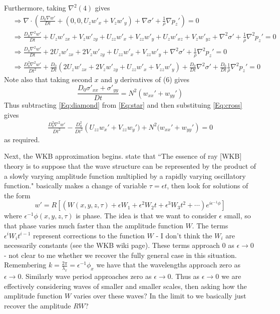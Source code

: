 \documentclass[12pt]{article}
\begin{document}
Furthermore, taking $\nabla^2 (4)$ gives
\begin{align}
&\Rightarrow \nabla \cdot \left(\frac{D_0 \nabla w'}{D t} + (0,0,U_z w'_x + V_z w'_y) + \nabla \sigma' +\frac{1}{\overline{\rho}} \nabla p_z' \right) = 0 \\
&\Rightarrow \frac{D_0 \nabla^2 w'}{D t} + U_z w'_{zx} + V_z w'_{zy} + U_{zz} w'_x + V_{zz} w'_y + U_z w'_{xz} + V_z w'_{yz} + \nabla^2 \sigma' +\frac{1}{\overline{\rho}} \nabla^2 p_z' = 0 \\
&\Rightarrow \frac{D_0 \nabla^2 w'}{D t} + 2U_z w'_{zx} + 2V_z w'_{zy} + U_{zz} w'_x + V_{zz} w'_y + \nabla^2 \sigma' +\frac{1}{\overline{\rho}} \nabla^2 p_z' = 0 \\
&\Rightarrow \frac{D_0^2 \nabla^2 w'}{D t^2} + \frac{D_0}{Dt}\left(2U_z w'_{zx} + 2V_z w'_{zy} + U_{zz} w'_x + V_{zz} w'_y\right) + \frac{D_0}{Dt}\nabla^2 \sigma' + \frac{D_0}{Dt}\frac{1}{\overline{\rho}} \nabla^2 p_z' = 0  \label{Eq:star}
\end{align}
Note also that taking second $x$ and $y$ derivatives of (6) gives
\begin{equation}
\frac{D_0 \sigma'_{xx} +\sigma'_{yy}}{D t} = N^2 (w_{xx}'+w_{yy}') \label{Eq:cross}
\end{equation}
Thus subtracting \ref{Eq:diamond} from \ref{Eq:star} and then substituing \ref{Eq:cross} gives
\begin{align}
\frac{D_0^2 \nabla^2 w'}{D t^2} - \frac{D_0^2 }{D t^2} \left(U_{zz}w_x' + V_{zz} w_y') + N^2 (w_{xx}'+w_{yy}'\right) = 0
\end{align}
as required.

Next, the WKB approximation begins. \citet[p. 317]{sutherland10} state that ``The essence of ray [WKB] theory is to suppose that the wave structure can be represented by the product of a slowly varying amplitude function multiplied by a rapidly varying oscillatory function." \citet[p. 470]{bretherton66} basically makes a change of variable $\tau = \epsilon t$, then look for solutions of the form
\begin{equation}
w' = R[(W(x,y,z,\tau)+\epsilon W_1 + \epsilon^2 W_2 t + \epsilon^3 W_3 t^2 + \cdots ) e^{i\epsilon^{-1} \phi} ]
\end{equation}
where $\epsilon^{-1}\phi(x,y,z,\tau)$ is phase. The idea is that we want to consider $\epsilon$ small, so that phase varies much faster than the amplitude function $W$. The terms $\epsilon^i W_i t^{i-1}$ represent corrections to the function $W$ - I don't think the $W_i$ are necessarily constants (see the WKB wiki page). These terms approach $0$ as $\epsilon \to 0$ - not clear to me whether we recover the fully general case in this situation. Remembering $k = \frac{2\pi}{\lambda_x} = \epsilon^{-1} \phi_x$ we have that the wavelengths approach zero as $\epsilon \to 0$. Similarly wave period approaches zero as $\epsilon \to 0$. Thus as $\epsilon \to 0$ we are effectively considering waves of smaller and smaller scales, then asking how the amplitude function $W$ varies over these waves? In the limit to we basically just recover the amplitude $RW$?
\end{document}
